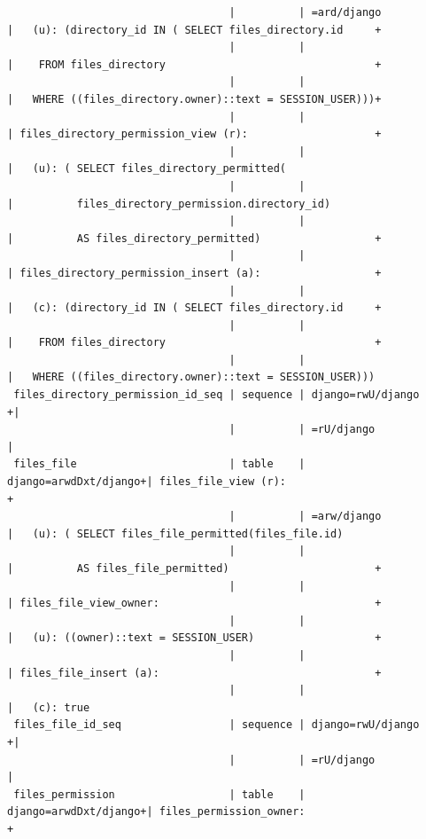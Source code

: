 \documentclass[12pt]{report}
\begin{document}
\begin{landscape}
{\begin{verbatim}
                                   |          | =ard/django           |   (u): (directory_id IN ( SELECT files_directory.id     +
                                   |          |                       |    FROM files_directory                                 +
                                   |          |                       |   WHERE ((files_directory.owner)::text = SESSION_USER)))+
                                   |          |                       | files_directory_permission_view (r):                    +
                                   |          |                       |   (u): ( SELECT files_directory_permitted(
                                   |          |                       |          files_directory_permission.directory_id)
                                   |          |                       |          AS files_directory_permitted)                  +
                                   |          |                       | files_directory_permission_insert (a):                  +
                                   |          |                       |   (c): (directory_id IN ( SELECT files_directory.id     +
                                   |          |                       |    FROM files_directory                                 +
                                   |          |                       |   WHERE ((files_directory.owner)::text = SESSION_USER)))
 files_directory_permission_id_seq | sequence | django=rwU/django    +|
                                   |          | =rU/django            |
 files_file                        | table    | django=arwdDxt/django+| files_file_view (r):                                    +
                                   |          | =arw/django           |   (u): ( SELECT files_file_permitted(files_file.id)
                                   |          |                       |          AS files_file_permitted)                       +
                                   |          |                       | files_file_view_owner:                                  +
                                   |          |                       |   (u): ((owner)::text = SESSION_USER)                   +
                                   |          |                       | files_file_insert (a):                                  +
                                   |          |                       |   (c): true
 files_file_id_seq                 | sequence | django=rwU/django    +|
                                   |          | =rU/django            |
 files_permission                  | table    | django=arwdDxt/django+| files_permission_owner:                                 +

\end{verbatim}}
\end{landscape}
\end{document}
